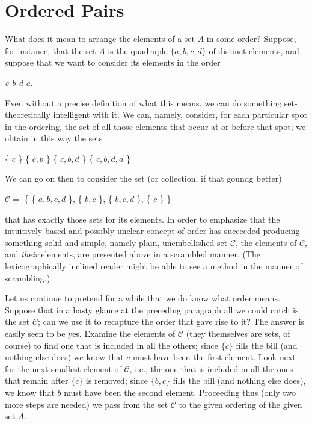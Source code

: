 

\chapter{Ordered Pairs}

What does it mean to arrange the elements of a set $A$ in some order? Suppose, for instance, that the set $A$ is the quadruple $ \{a, b, c, d \} $ of distinct elements, and suppose that we want to consider its elements in the order 

\begin{center}
\textit{c b d a}.
\end{center}

Even without a precise definition of what this means, we can do something set-theoretically intelligent with it. We can, namely, consider, for each particular spot in the ordering, the set of all those elements that occur at or before that spot; we obtain in this way the sets 

\begin{center}
 \{ $c$ \}  \{ $c, b$ \} \{ $c, b, d$ \} \{ $c, b, d, a$ \} 
\end{center}

We can go on then to consider the set (or collection, if that goundg better) 

\begin{center}
$\mathcal{C} = $ \{ \{ $a, b, c, d$ \}, \{ $b, c$ \}, \{ $b, c, d$ \}, \{ $c$ \} \} 
\end{center}

that has exactly those sets for its elements. In order to emphasize that the intuitively based and possibly unclear concept of order has succeeded producing something solid and simple, namely plain,  unembellished set $ \mathcal{C} $, the elements of $ \mathcal{C} $, and \textit{their} elements, are presented above in a scrambled manner. (The lexicographically inclined reader might be able to see a method in the manner of scrambling.) 

Let us continue to pretend for a while that we do know what order means. Suppose that in a hasty glance at the preceding paragraph all we could catch is the set $\mathcal{C}$; can we use it to recapture the order that gave rise to it? The answer is easily seen to be yes. Examine the elements of $ \mathcal{C} $ (they themselves are sets, of course) to find one that is included in all the others; since $ \{c \}$ fills the bill (and nothing else does) we know that $c$ must have been the first element. Look next for the next smallest element of $ \mathcal{C}$, i.e., the one that is included in all the ones that remain after $ \{ c \} $ is removed; since $ \{ b, c \} $ fills the bill (and nothing else does), we know that $b$ must have been the second element. Proceeding thus (only two more steps are needed) we pass from the set $ \mathcal{C} $ to the given ordering of the given set $A$. 


